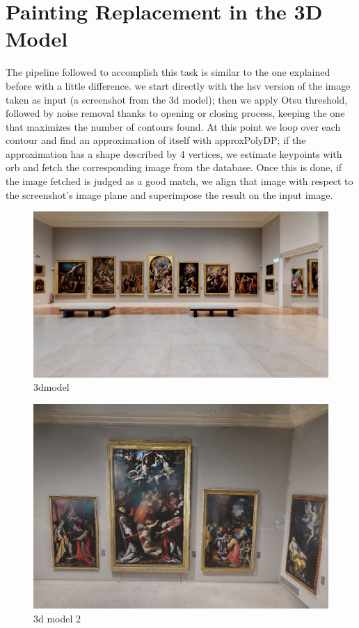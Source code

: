 \documentclass[conference]{IEEEtran}
\begin{document}
\section{Painting Replacement in the 3D Model}
The pipeline followed to accomplish this task is similar to the one explained before with a little difference. we start directly with the hsv version of the image taken as input (a screenshot from the 3d model); then we apply Otsu threshold, followed by noise removal thanks to opening or closing process, keeping the one that maximizes the number of contours found. At this point we loop over each contour and find an approximation of itself with approxPolyDP; if the approximation has a shape described by 4 vertices, we estimate keypoints with orb and fetch the corresponding image from the database. Once this is done, if the image fetched is judged as a good match, we align that image with respect to the screenshot’s image plane and superimpose the result on the input image.

\begin{figure}[htbp]
\centerline{\includegraphics[width=0.8\columnwidth]{../screenshots_3d_model/screenshot_01.jpg}}
\caption{3dmodel}
\label{fig_3d_model}
\end{figure}

\begin{figure}[htbp]
\centerline{\includegraphics[width=0.8\columnwidth]{../screenshots_3d_model/screenshot_03.png}}
\caption{3d model 2}
\label{fig_3d_model_2}
\end{figure}
\end{document}
